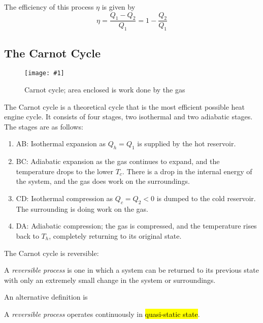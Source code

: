\documentclass[a4paper,12pt]{article}
\newcommand{\img}[4]{\begin{center}
  \begin{figure}[H]
    \centering
    \texttt{[image: \#1]}
    \caption{#3}
    \label{fig:#4}
  \end{figure}
\end{center}}
\begin{document}
The efficiency of this process $\eta$ is given by
\begin{equation}\label{eq:heat_engine_efficiency}
  \eta = \frac{Q_1 - Q_2}{Q_1} = 1 - \dfrac{Q_2}{Q_1}
\end{equation}

\pagebreak

\subsection{The Carnot Cycle}

\img{carnot.png}{0.5}{Carnot cycle; area enclosed is work done by the gas}{carnot}

The Carnot cycle is a theoretical cycle that is the most efficient possible heat engine cycle. It consists of four stages, two isothermal and two adiabatic stages. The stages are as follows:
\begin{enumerate}
  \item AB: Isothermal expansion as $Q_h = Q_1$ is supplied by the hot reservoir.
  \item BC: Adiabatic expansion as the gas continues to expand, and the temperature drops to the lower $T_c$. There is a drop in the internal energy of the system, and the gas does work on the surroundings.
  \item CD: Isothermal compression as $Q_c = Q_2 < 0$ is dumped to the cold reservoir. The surrounding is doing work on the gas.
  \item DA: Adiabatic compression; the gas is compressed, and the temperature rises back to $T_h$, completely returning to its original state.
\end{enumerate}

\pagebreak

The Carnot cycle is reversible:
\begin{center}
  A \textit{reversible process} is one in which a system can be returned to its previous state with only an extremely small change in the system or surroundings.
\end{center}
An alternative definition is
\begin{center}
  A \textit{reversible process} operates continuously in \hl{quasi-static state}.
\end{center}
\end{document}

